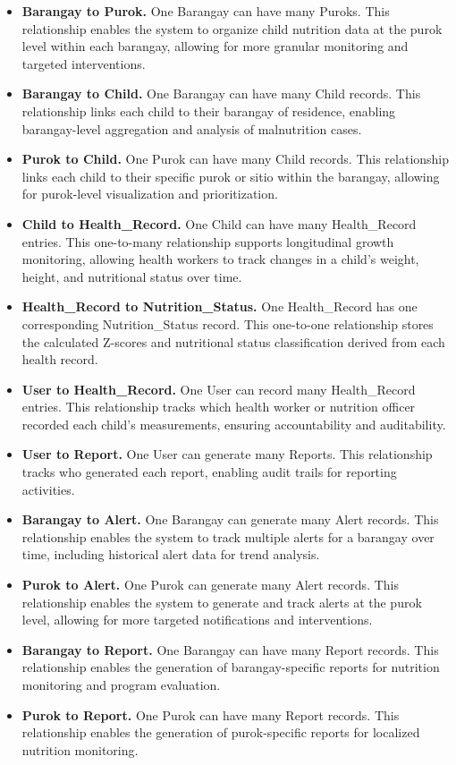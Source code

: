 \documentclass[12pt, a4paper]{report}
\begin{document}
\begin{itemize}
    \item \textbf{Barangay to Purok.} One Barangay can have many Puroks. This relationship enables the system to organize child nutrition data at the purok level within each barangay, allowing for more granular monitoring and targeted interventions.
    \item \textbf{Barangay to Child.} One Barangay can have many Child records. This relationship links each child to their barangay of residence, enabling barangay-level aggregation and analysis of malnutrition cases.
    \item \textbf{Purok to Child.} One Purok can have many Child records. This relationship links each child to their specific purok or sitio within the barangay, allowing for purok-level visualization and prioritization.
    \item \textbf{Child to Health\_Record.} One Child can have many Health\_Record entries. This one-to-many relationship supports longitudinal growth monitoring, allowing health workers to track changes in a child's weight, height, and nutritional status over time.
    \item \textbf{Health\_Record to Nutrition\_Status.} One Health\_Record has one corresponding Nutrition\_Status record. This one-to-one relationship stores the calculated Z-scores and nutritional status classification derived from each health record.
    \item \textbf{User to Health\_Record.} One User can record many Health\_Record entries. This relationship tracks which health worker or nutrition officer recorded each child's measurements, ensuring accountability and auditability.
    \item \textbf{User to Report.} One User can generate many Reports. This relationship tracks who generated each report, enabling audit trails for reporting activities.
    \item \textbf{Barangay to Alert.} One Barangay can generate many Alert records. This relationship enables the system to track multiple alerts for a barangay over time, including historical alert data for trend analysis.
    \item \textbf{Purok to Alert.} One Purok can generate many Alert records. This relationship enables the system to generate and track alerts at the purok level, allowing for more targeted notifications and interventions.
    \item \textbf{Barangay to Report.} One Barangay can have many Report records. This relationship enables the generation of barangay-specific reports for nutrition monitoring and program evaluation.
    \item \textbf{Purok to Report.} One Purok can have many Report records. This relationship enables the generation of purok-specific reports for localized nutrition monitoring.
\end{itemize}
\end{document}
